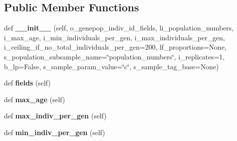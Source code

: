 \subsection*{Public Member Functions}
\begin{DoxyCompactItemize}
\item 
def {\bfseries \+\_\+\+\_\+init\+\_\+\+\_\+} (self, o\+\_\+genepop\+\_\+indiv\+\_\+id\+\_\+fields, li\+\_\+population\+\_\+numbers, i\+\_\+max\+\_\+age, i\+\_\+min\+\_\+individuals\+\_\+per\+\_\+gen, i\+\_\+max\+\_\+individuals\+\_\+per\+\_\+gen, i\+\_\+ceiling\+\_\+if\+\_\+no\+\_\+total\+\_\+individuals\+\_\+per\+\_\+gen=200, lf\+\_\+proportions=None, s\+\_\+population\+\_\+subsample\+\_\+name=\char`\"{}population\+\_\+numbers\char`\"{}, i\+\_\+replicates=1, b\+\_\+lp=False, s\+\_\+sample\+\_\+param\+\_\+value=\char`\"{}c\char`\"{}, s\+\_\+sample\+\_\+tag\+\_\+base=None)\hypertarget{classnegui_1_1genepopfilesampler_1_1GenepopFileSampleParamsAgeStructureCohorts_a29b40365ec9b1944b31e86e1b770cf49}{}\label{classnegui_1_1genepopfilesampler_1_1GenepopFileSampleParamsAgeStructureCohorts_a29b40365ec9b1944b31e86e1b770cf49}

\item 
def {\bfseries fields} (self)\hypertarget{classnegui_1_1genepopfilesampler_1_1GenepopFileSampleParamsAgeStructureCohorts_a452edd8b92914959a971f988593ef260}{}\label{classnegui_1_1genepopfilesampler_1_1GenepopFileSampleParamsAgeStructureCohorts_a452edd8b92914959a971f988593ef260}

\item 
def {\bfseries max\+\_\+age} (self)\hypertarget{classnegui_1_1genepopfilesampler_1_1GenepopFileSampleParamsAgeStructureCohorts_a80713312b25a2d697db86b3324481748}{}\label{classnegui_1_1genepopfilesampler_1_1GenepopFileSampleParamsAgeStructureCohorts_a80713312b25a2d697db86b3324481748}

\item 
def {\bfseries max\+\_\+indiv\+\_\+per\+\_\+gen} (self)\hypertarget{classnegui_1_1genepopfilesampler_1_1GenepopFileSampleParamsAgeStructureCohorts_ac2f10550f834730b4b84b569008dc313}{}\label{classnegui_1_1genepopfilesampler_1_1GenepopFileSampleParamsAgeStructureCohorts_ac2f10550f834730b4b84b569008dc313}

\item 
def {\bfseries min\+\_\+indiv\+\_\+per\+\_\+gen} (self)\hypertarget{classnegui_1_1genepopfilesampler_1_1GenepopFileSampleParamsAgeStructureCohorts_a66fbdc9dab917e3ef6a42817652d0d98}{}\label{classnegui_1_1genepopfilesampler_1_1GenepopFileSampleParamsAgeStructureCohorts_a66fbdc9dab917e3ef6a42817652d0d98}


\end{DoxyCompactItemize}
